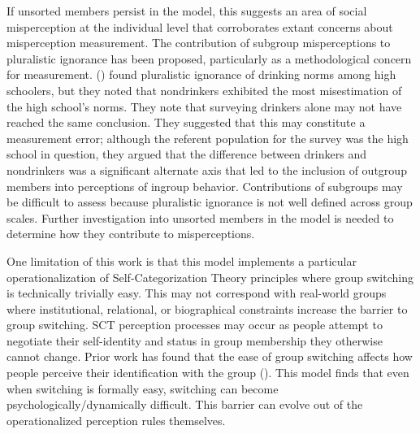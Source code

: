 If unsorted members persist in the model, this suggests an area of social misperception at the individual level that corroborates extant concerns about misperception measurement. 
The contribution of subgroup misperceptions to pluralistic ignorance has been proposed, particularly as a methodological concern for measurement. 
(\cite{segrist_yeah_2007}) found pluralistic ignorance of drinking norms among high schoolers, but they noted that nondrinkers exhibited the most misestimation of the high school's norms. They note that surveying drinkers alone may not have reached the same conclusion. 
They suggested that this may constitute a measurement error; although the referent population for the survey was the high school in question, they argued that the difference between drinkers and nondrinkers was a significant alternate axis that led to the inclusion of outgroup members into perceptions of ingroup behavior. 
Contributions of subgroups may be difficult to assess because pluralistic ignorance is not well defined across group scales. 
Further investigation into unsorted members in the model is needed to determine how they contribute to misperceptions. 

One limitation of this work is that this model implements a particular operationalization of Self-Categorization Theory principles where group switching is technically trivially easy. 
This may not correspond with real-world groups where institutional, relational, or biographical constraints increase the barrier to group switching. 
SCT perception processes may occur as people attempt to negotiate their self-identity and status in group membership they otherwise cannot change. 
Prior work has found that the ease of group switching affects how people perceive their identification with the group (\cite{ellemers_influence_1990}). 
This model finds that even when switching is formally easy, switching can become psychologically/dynamically difficult. 
This barrier can evolve out of the operationalized perception rules themselves. 

